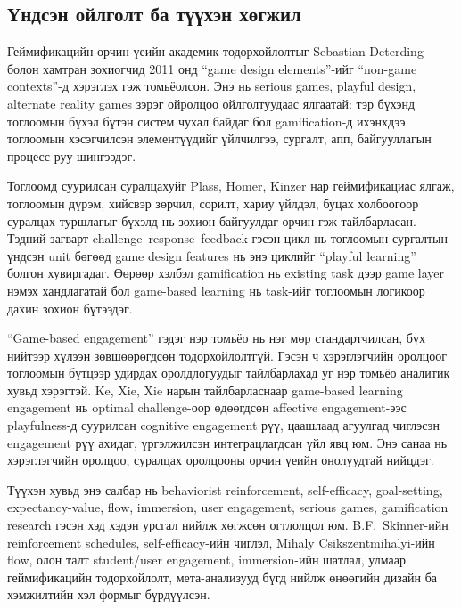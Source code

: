 \begin{sloppy}
\section{Үндсэн ойлголт ба түүхэн хөгжил}

Геймификацийн орчин үеийн академик тодорхойлолтыг Sebastian Deterding болон хамтран зохиогчид 2011 онд ``game design elements''-ийг ``non-game contexts''-д хэрэглэх гэж томьёолсон. Энэ нь serious games, playful design, alternate reality games зэрэг ойролцоо ойлголтуудаас ялгаатай: тэр бүхэнд тоглоомын бүхэл бүтэн систем чухал байдаг бол gamification-д ихэнхдээ тоглоомын хэсэгчилсэн элементүүдийг үйлчилгээ, сургалт, апп, байгууллагын процесс руу шингээдэг.

Тоглоомд суурилсан суралцахуйг Plass, Homer, Kinzer нар геймификациас ялгаж, тоглоомын дүрэм, хийсвэр зөрчил, сорилт, хариу үйлдэл, буцах холбоогоор суралцах туршлагыг бүхэлд нь зохион байгуулдаг орчин гэж тайлбарласан. Тэдний загварт challenge--response--feedback гэсэн цикл нь тоглоомын сургалтын үндсэн unit бөгөөд game design features нь энэ циклийг ``playful learning'' болгон хувиргадаг. Өөрөөр хэлбэл gamification нь existing task дээр game layer нэмэх хандлагатай бол game-based learning нь task-ийг тоглоомын логикоор дахин зохион бүтээдэг.

``Game-based engagement'' гэдэг нэр томьёо нь нэг мөр стандартчилсан, бүх нийтээр хүлээн зөвшөөрөгдсөн тодорхойлолтгүй. Гэсэн ч хэрэглэгчийн оролцоог тоглоомын бүтцээр удирдах оролдлогуудыг тайлбарлахад уг нэр томьёо аналитик хувьд хэрэгтэй. Ke, Xie, Xie нарын тайлбарласнаар game-based learning engagement нь optimal challenge-оор өдөөгдсөн affective engagement-ээс playfulness-д суурилсан cognitive engagement рүү, цаашлаад агуулгад чиглэсэн engagement рүү ахидаг, үргэлжилсэн интеграцлагдсан үйл явц юм. Энэ санаа нь хэрэглэгчийн оролцоо, суралцах оролцооны орчин үеийн онолуудтай нийцдэг.

Түүхэн хувьд энэ салбар нь behaviorist reinforcement, self-efficacy, goal-setting, expectancy-value, flow, immersion, user engagement, serious games, gamification research гэсэн хэд хэдэн урсгал нийлж хөгжсөн огтлолцол юм. B.F.~Skinner-ийн reinforcement schedules, self-efficacy-ийн чиглэл, Mihaly Csikszentmihalyi-ийн flow, олон талт student/user engagement, immersion-ийн шатлал, улмаар геймификацийн тодорхойлолт, мета-анализууд бүгд нийлж өнөөгийн дизайн ба хэмжилтийн хэл формыг бүрдүүлсэн.


\end{sloppy}
